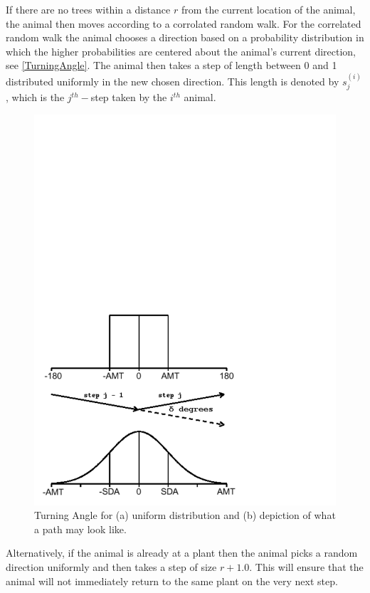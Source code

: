   If there are no trees within a distance $r$ from the current location of the animal, the animal then
  moves according to a corrolated random walk.  For the correlated random walk the animal chooses a
  direction based on a probability distribution in which the higher probabilities are centered about
  the animal's current direction, see \autoref{TurningAngle}.  The animal then takes a step of
  length between 0 and 1 distributed uniformly in the new chosen direction.  This length is denoted by
  $s_j^{(i)}$, which is the $j^{th}-$step taken by the $i^{th}$ animal.
  \begin{figure}[H]\label{TurningAngle}
    \begin{center}
    \includegraphics[scale=0.5,trim=0 30 150 510]{TADistribution.pdf}
    \end{center}
    \caption{Turning Angle for (a) uniform distribution and (b) depiction
    of what a path may look like.}
  \end{figure}
  Alternatively, if the animal is already at a plant then the animal picks a random direction
  uniformly and then takes a step of size $r+1.0$.  This will ensure that the animal will not
  immediately return to the same plant on the very next step.

